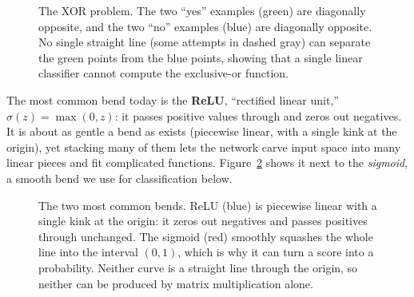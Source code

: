 \begin{figure}[htbp]
\centering
{}
\caption{The XOR problem. The two ``yes'' examples (green) are diagonally opposite, and the two ``no'' examples (blue) are diagonally opposite. No single straight line (some attempts in dashed gray) can separate the green points from the blue points, showing that a single linear classifier cannot compute the exclusive-or function.}
\label{ch34:fig-xor}
\end{figure}

The most common bend today is the \textbf{ReLU}, ``rectified linear unit,''
$\sigma(z)=\max(0,z)$: it passes positive values through and zeros out negatives. It is
about as gentle a bend as exists (piecewise linear, with a single kink at the origin),
yet stacking many of them lets the network carve input space into many linear pieces and
fit complicated functions. Figure~\ref{ch34:fig-activations} shows it next to the
\emph{sigmoid}, a smooth bend we use for classification below.

\begin{figure}[htbp]
\centering
{}
\caption{The two most common bends. ReLU (blue) is piecewise linear with a single kink at
the origin: it zeros out negatives and passes positives through unchanged. The sigmoid
(red) smoothly squashes the whole line into the interval $(0,1)$, which is why it can turn
a score into a probability. Neither curve is a straight line through the origin, so
neither can be produced by matrix multiplication alone.}
\label{ch34:fig-activations}
\end{figure}

